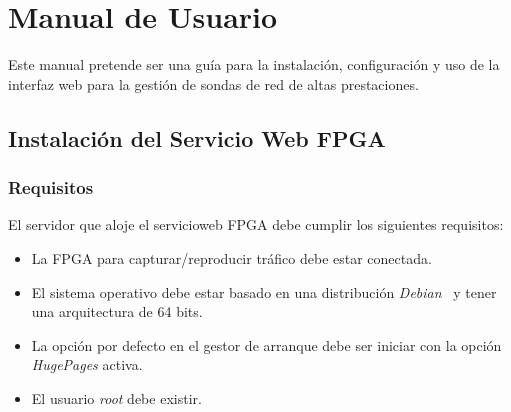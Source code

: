 \chapter{Manual de Usuario\label{extra:manual_de_usuario}}

Este manual pretende ser una guía para la instalación, configuración y uso de la interfaz web para la gestión de sondas de red de altas prestaciones.

\section{Instalación del Servicio Web FPGA\label{extra:manual:instalacionfpga}}

\subsection*{Requisitos}
El servidor que aloje el \gls{servicioweb} \gls{FPGA} debe cumplir los siguientes requisitos:
\begin{itemize}
  \item La \gls{FPGA} para capturar/reproducir tráfico debe estar conectada.
  \item El sistema operativo debe estar basado en una distribución \textit{Debian}~\cite{debian} y tener una arquitectura de 64 bits.
  \item La opción por defecto en el gestor de arranque debe ser iniciar con la opción \textit{HugePages} activa.
  \item El usuario \textit{root} debe existir.
\end{itemize}

